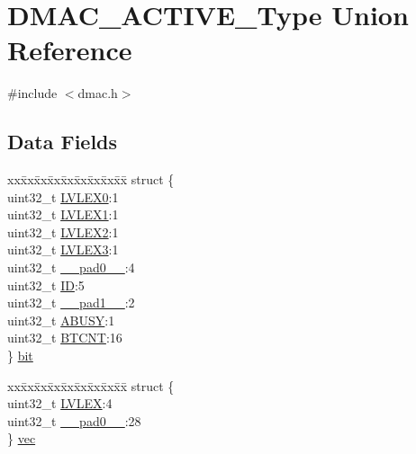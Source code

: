 \hypertarget{union_d_m_a_c___a_c_t_i_v_e___type}{}\section{D\+M\+A\+C\+\_\+\+A\+C\+T\+I\+V\+E\+\_\+\+Type Union Reference}
\label{union_d_m_a_c___a_c_t_i_v_e___type}


{\ttfamily \#include $<$dmac.\+h$>$}

\subsection*{Data Fields}
\begin{DoxyCompactItemize}
\item 
\begin{tabbing}
xx\=xx\=xx\=xx\=xx\=xx\=xx\=xx\=xx\=\kill
struct \{\\
\>uint32\_t \mbox{\hyperlink{union_d_m_a_c___a_c_t_i_v_e___type_a6624d04653e4ac74c641d60a8361b533}{LVLEX0}}:1\\
\>uint32\_t \mbox{\hyperlink{union_d_m_a_c___a_c_t_i_v_e___type_a28595377492ff3212653677900376256}{LVLEX1}}:1\\
\>uint32\_t \mbox{\hyperlink{union_d_m_a_c___a_c_t_i_v_e___type_a2d9150499965f33b854614a51fb20772}{LVLEX2}}:1\\
\>uint32\_t \mbox{\hyperlink{union_d_m_a_c___a_c_t_i_v_e___type_ae6d2ed1633ab7955275eb7d36fe1e575}{LVLEX3}}:1\\
\>uint32\_t \mbox{\hyperlink{union_d_m_a_c___a_c_t_i_v_e___type_a3e57c2ef1c3ffb36722f000cc1156824}{\_\_pad0\_\_}}:4\\
\>uint32\_t \mbox{\hyperlink{union_d_m_a_c___a_c_t_i_v_e___type_a505f98fde467109a9b37b3c7e008df91}{ID}}:5\\
\>uint32\_t \mbox{\hyperlink{union_d_m_a_c___a_c_t_i_v_e___type_a6712ba6dd1d5b43d2d56ff8ac4e275a7}{\_\_pad1\_\_}}:2\\
\>uint32\_t \mbox{\hyperlink{union_d_m_a_c___a_c_t_i_v_e___type_a5232eb8b3af41dedfd0e66dfd87afbed}{ABUSY}}:1\\
\>uint32\_t \mbox{\hyperlink{union_d_m_a_c___a_c_t_i_v_e___type_adf99f5ee10f65d3a3534be45e40443c5}{BTCNT}}:16\\
\} \mbox{\hyperlink{union_d_m_a_c___a_c_t_i_v_e___type_a8fa91c228405e4e1339cc5d4f7525fa2}{bit}}\\

\end{tabbing}\item 
\begin{tabbing}
xx\=xx\=xx\=xx\=xx\=xx\=xx\=xx\=xx\=\kill
struct \{\\
\>uint32\_t \mbox{\hyperlink{union_d_m_a_c___a_c_t_i_v_e___type_acc81ef8b624cac7f405fe64738d58441}{LVLEX}}:4\\
\>uint32\_t \mbox{\hyperlink{union_d_m_a_c___a_c_t_i_v_e___type_a3e57c2ef1c3ffb36722f000cc1156824}{\_\_pad0\_\_}}:28\\
\} \mbox{\hyperlink{union_d_m_a_c___a_c_t_i_v_e___type_ad26d8145fcd68425820a701b165cdd73}{vec}}\\


\end{tabbing}
\end{DoxyCompactItemize}
